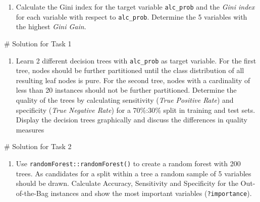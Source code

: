 \documentclass[11pt,]{article}
\newenvironment{Shaded}{}{}
\newcommand{\CommentTok}[1]{\textcolor[rgb]{0.00,0.50,0.00}{#1}}
\newcommand{\KeywordTok}[1]{\textcolor[rgb]{0.00,0.00,1.00}{#1}}
\newcommand{\NormalTok}[1]{#1}
\newcommand{\StringTok}[1]{\textcolor[rgb]{0.00,0.50,0.50}{#1}}
\providecommand{\tightlist}{%
  \setlength{\itemsep}{0pt}\setlength{\parskip}{0pt}}
\begin{document}
\begin{Shaded}
\begin{Highlighting}[]
{\NormalTok{  \}}
  
\NormalTok{  TotalGinni<-}\StringTok{ }\KeywordTok{do.call}\NormalTok{(rbind, GiniGainList)}
\NormalTok{\}}

\KeywordTok{main.function}\NormalTok{(StudentDF)}
\end{Highlighting}
\end{Shaded}

\begin{enumerate}
\def\labelenumi{\arabic{enumi}.}
\tightlist
\item
  Calculate the Gini index for the target variable \texttt{alc\_prob}
  and the \emph{Gini index} for each variable with respect to
  \texttt{alc\_prob}. Determine the 5 variables with the highest
  \emph{Gini Gain}.
\end{enumerate}

\begin{Shaded}
\begin{Highlighting}[]
\CommentTok{# Solution for Task 1}
\end{Highlighting}
\end{Shaded}

\begin{enumerate}
\def\labelenumi{\arabic{enumi}.}
\setcounter{enumi}{1}
\tightlist
\item
  Learn 2 different decision trees with \texttt{alc\_prob} as target
  variable. For the first tree, nodes should be further partitioned
  until the class distribution of all resulting leaf nodes is pure. For
  the second tree, nodes with a cardinality of less than 20 instances
  should not be further partitioned. Determine the quality of the trees
  by calculating sensitivity (\emph{True Positive Rate}) and specificity
  (\emph{True Negative Rate}) for a 70\%:30\% split in training and test
  sets. Display the decision trees graphically and discuss the
  differences in quality measures
\end{enumerate}

\begin{Shaded}
\begin{Highlighting}[]
\CommentTok{# Solution for Task 2}
\end{Highlighting}
\end{Shaded}

\begin{enumerate}
\def\labelenumi{\arabic{enumi}.}
\setcounter{enumi}{2}
\tightlist
\item
  Use \texttt{randomForest::randomForest()} to create a random forest
  with 200 trees. As candidates for a split within a tree a random
  sample of 5 variables should be drawn. Calculate Accuracy, Sensitivity
  and Specificity for the Out-of-the-Bag instances and show the most
  important variables (\texttt{?importance}).
\end{enumerate}
\end{document}
